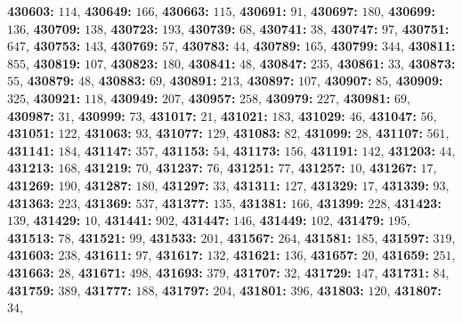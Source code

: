 \textsf{\bfseries 430603:} $114$, \textsf{\bfseries 430649:} $166$, \textsf{\bfseries 430663:} $115$, \textsf{\bfseries 430691:} $91$, \textsf{\bfseries 430697:} $180$, \textsf{\bfseries 430699:} $136$, \textsf{\bfseries 430709:} $138$, \textsf{\bfseries 430723:} $193$, \textsf{\bfseries 430739:} $68$, \textsf{\bfseries 430741:} $38$, \textsf{\bfseries 430747:} $97$, \textsf{\bfseries 430751:} $647$, \textsf{\bfseries 430753:} $143$, \textsf{\bfseries 430769:} $57$, \textsf{\bfseries 430783:} $44$, \textsf{\bfseries 430789:} $165$, \textsf{\bfseries 430799:} $344$, \textsf{\bfseries 430811:} $855$, \textsf{\bfseries 430819:} $107$, \textsf{\bfseries 430823:} $180$, \textsf{\bfseries 430841:} $48$, \textsf{\bfseries 430847:} $235$, \textsf{\bfseries 430861:} $33$, \textsf{\bfseries 430873:} $55$, \textsf{\bfseries 430879:} $48$, \textsf{\bfseries 430883:} $69$, \textsf{\bfseries 430891:} $213$, \textsf{\bfseries 430897:} $107$, \textsf{\bfseries 430907:} $85$, \textsf{\bfseries 430909:} $325$, \textsf{\bfseries 430921:} $118$, \textsf{\bfseries 430949:} $207$, \textsf{\bfseries 430957:} $258$, \textsf{\bfseries 430979:} $227$, \textsf{\bfseries 430981:} $69$, \textsf{\bfseries 430987:} $31$, \textsf{\bfseries 430999:} $73$, \textsf{\bfseries 431017:} $21$, \textsf{\bfseries 431021:} $183$, \textsf{\bfseries 431029:} $46$, \textsf{\bfseries 431047:} $56$, \textsf{\bfseries 431051:} $122$, \textsf{\bfseries 431063:} $93$, \textsf{\bfseries 431077:} $129$, \textsf{\bfseries 431083:} $82$, \textsf{\bfseries 431099:} $28$, \textsf{\bfseries 431107:} $561$, \textsf{\bfseries 431141:} $184$, \textsf{\bfseries 431147:} $357$, \textsf{\bfseries 431153:} $54$, \textsf{\bfseries 431173:} $156$, \textsf{\bfseries 431191:} $142$, \textsf{\bfseries 431203:} $44$, \textsf{\bfseries 431213:} $168$, \textsf{\bfseries 431219:} $70$, \textsf{\bfseries 431237:} $76$, \textsf{\bfseries 431251:} $77$, \textsf{\bfseries 431257:} $10$, \textsf{\bfseries 431267:} $17$, \textsf{\bfseries 431269:} $190$, \textsf{\bfseries 431287:} $180$, \textsf{\bfseries 431297:} $33$, \textsf{\bfseries 431311:} $127$, \textsf{\bfseries 431329:} $17$, \textsf{\bfseries 431339:} $93$, \textsf{\bfseries 431363:} $223$, \textsf{\bfseries 431369:} $537$, \textsf{\bfseries 431377:} $135$, \textsf{\bfseries 431381:} $166$, \textsf{\bfseries 431399:} $228$, \textsf{\bfseries 431423:} $139$, \textsf{\bfseries 431429:} $10$, \textsf{\bfseries 431441:} $902$, \textsf{\bfseries 431447:} $146$, \textsf{\bfseries 431449:} $102$, \textsf{\bfseries 431479:} $195$, \textsf{\bfseries 431513:} $78$, \textsf{\bfseries 431521:} $99$, \textsf{\bfseries 431533:} $201$, \textsf{\bfseries 431567:} $264$, \textsf{\bfseries 431581:} $185$, \textsf{\bfseries 431597:} $319$, \textsf{\bfseries 431603:} $238$, \textsf{\bfseries 431611:} $97$, \textsf{\bfseries 431617:} $132$, \textsf{\bfseries 431621:} $136$, \textsf{\bfseries 431657:} $20$, \textsf{\bfseries 431659:} $251$, \textsf{\bfseries 431663:} $28$, \textsf{\bfseries 431671:} $498$, \textsf{\bfseries 431693:} $379$, \textsf{\bfseries 431707:} $32$, \textsf{\bfseries 431729:} $147$, \textsf{\bfseries 431731:} $84$, \textsf{\bfseries 431759:} $389$, \textsf{\bfseries 431777:} $188$, \textsf{\bfseries 431797:} $204$, \textsf{\bfseries 431801:} $396$, \textsf{\bfseries 431803:} $120$, \textsf{\bfseries 431807:} $34$, 
